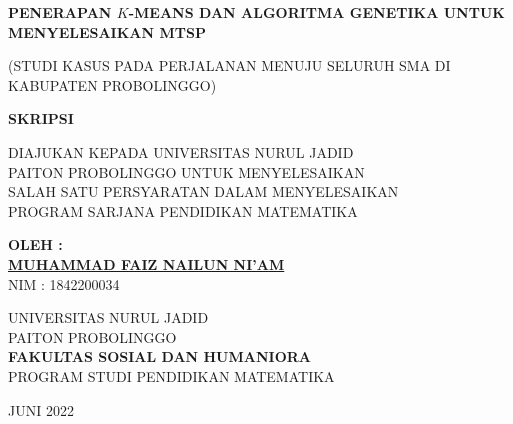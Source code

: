 \begin{center}

\textbf{PENERAPAN $K$-MEANS DAN ALGORITMA GENETIKA UNTUK MENYELESAIKAN MTSP}
       
       (STUDI KASUS PADA PERJALANAN MENUJU SELURUH SMA DI KABUPATEN PROBOLINGGO) 
       
       \vfill
       \textbf{SKRIPSI}
       \vfill
       
       DIAJUKAN KEPADA UNIVERSITAS NURUL JADID \\
       PAITON PROBOLINGGO UNTUK MENYELESAIKAN \\ SALAH SATU PERSYARATAN DALAM MENYELESAIKAN \\ PROGRAM SARJANA PENDIDIKAN MATEMATIKA
       
       \vfill       
       
       \textbf{OLEH :}\\
       \textbf{\underline{MUHAMMAD FAIZ NAILUN NI'AM}}\\
       NIM : 1842200034

       \vfill
       
       UNIVERSITAS NURUL JADID\\
       PAITON PROBOLINGGO\\
     \textbf{FAKULTAS SOSIAL DAN HUMANIORA}\\       
       PROGRAM STUDI PENDIDIKAN MATEMATIKA\\
       
       \vfill       
       
       JUNI 2022
       
   \end{center}